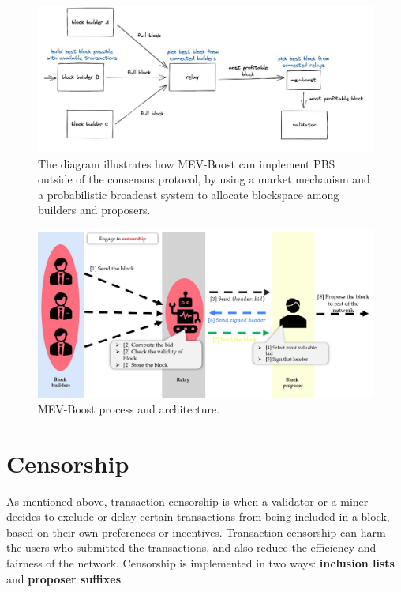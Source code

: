 \begin{center}
	\begin{figure}
		\centering
		\includegraphics[width=1\linewidth]{Fig/22/F6}
		\caption{The diagram illustrates how MEV-Boost can implement PBS outside of the consensus protocol, by using a market mechanism and a probabilistic broadcast system to allocate blockspace among builders and proposers.}
		\label{fig:L22_f6}
	\end{figure}
\end{center}
\begin{center}
	\begin{figure}
		\centering
		\includegraphics[width=1\linewidth]{Fig/22/F7}
		\caption{MEV-Boost process and architecture.}
		\label{fig:L22_f7}
	\end{figure}
\end{center}
\section{Censorship}
As mentioned above, transaction censorship is when a validator or a miner decides to exclude or delay certain transactions from being included in a block, based on their own preferences or incentives. Transaction censorship can harm the users who submitted the transactions, and also reduce the efficiency and fairness of the network.
Censorship is implemented in two ways: \textbf{inclusion lists} and \textbf{proposer suffixes}
